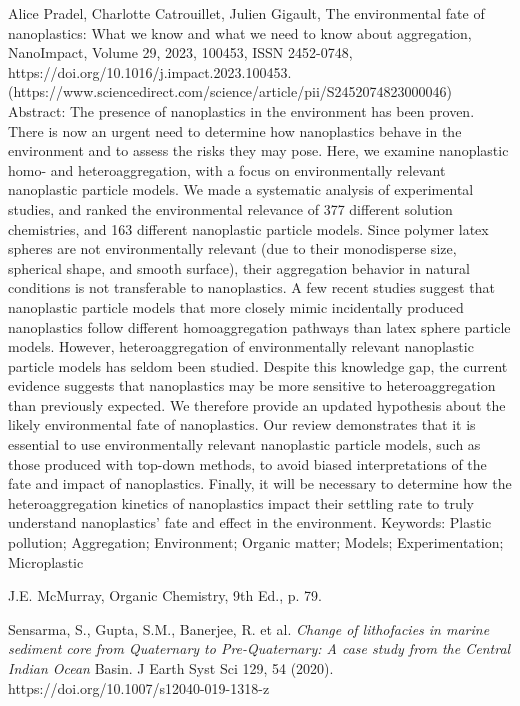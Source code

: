 \documentclass[twocolumn,a4paper,aps,amsmath,amssymb,floatfix,superscriptaddress]{revtex4-2}
\begin{document}
\begin{thebibliography}{10}
		Alice Pradel, Charlotte Catrouillet, Julien Gigault,
		The environmental fate of nanoplastics: What we know and what we need to know about aggregation,
		NanoImpact,
		Volume 29,
		2023,
		100453,
		ISSN 2452-0748,
		https://doi.org/10.1016/j.impact.2023.100453.
		(https://www.sciencedirect.com/science/article/pii/S2452074823000046)
		Abstract: The presence of nanoplastics in the environment has been proven. There is now an urgent need to determine how nanoplastics behave in the environment and to assess the risks they may pose. Here, we examine nanoplastic homo- and heteroaggregation, with a focus on environmentally relevant nanoplastic particle models. We made a systematic analysis of experimental studies, and ranked the environmental relevance of 377 different solution chemistries, and 163 different nanoplastic particle models. Since polymer latex spheres are not environmentally relevant (due to their monodisperse size, spherical shape, and smooth surface), their aggregation behavior in natural conditions is not transferable to nanoplastics. A few recent studies suggest that nanoplastic particle models that more closely mimic incidentally produced nanoplastics follow different homoaggregation pathways than latex sphere particle models. However, heteroaggregation of environmentally relevant nanoplastic particle models has seldom been studied. Despite this knowledge gap, the current evidence suggests that nanoplastics may be more sensitive to heteroaggregation than previously expected. We therefore provide an updated hypothesis about the likely environmental fate of nanoplastics. Our review demonstrates that it is essential to use environmentally relevant nanoplastic particle models, such as those produced with top-down methods, to avoid biased interpretations of the fate and impact of nanoplastics. Finally, it will be necessary to determine how the heteroaggregation kinetics of nanoplastics impact their settling rate to truly understand nanoplastics' fate and effect in the environment.
		Keywords: Plastic pollution; Aggregation; Environment; Organic matter; Models; Experimentation; Microplastic
		
		J.E. McMurray, Organic Chemistry, 9th Ed., p. 79.
		
		Sensarma, S., Gupta, S.M., Banerjee, R. et al. \textit{Change of lithofacies in marine sediment core from Quaternary to Pre-Quaternary: A case study from the Central Indian Ocean} Basin. J Earth Syst Sci 129, 54 (2020). https://doi.org/10.1007/s12040-019-1318-z 
		

\end{thebibliography}
\end{document}
